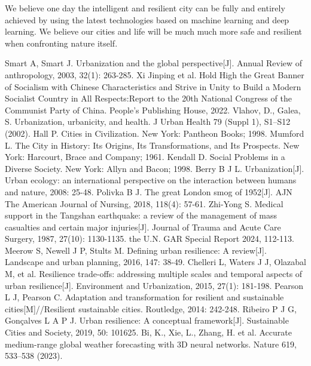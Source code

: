 \documentclass[conference]{IEEEtran}
\begin{document}
We believe one day the intelligent and resilient city can be fully and entirely achieved by using the latest technologies based on machine learning and deep learning. We believe our cities and life will be much much more safe and resilient when confronting nature itself.


\begin{thebibliography}{00}

 Smart A, Smart J. Urbanization and the global perspective[J]. Annual Review of anthropology, 2003, 32(1): 263-285.
 Xi Jinping et al. Hold High the Great Banner of Socialism with Chinese Characteristics and Strive in Unity to Build a Modern Socialist Country in All Respects:Report to the 20th National Congress of the Communist Party of China. People's Publishing House, 2022.
 Vlahov, D., Galea, S. Urbanization, urbanicity, and health. J Urban Health 79 (Suppl 1), S1–S12 (2002).
 Hall P. Cities in Civilization. New York: Pantheon Books; 1998.
 Mumford L. The City in History: Its Origins, Its Transformations, and Its Prospects. New York: Harcourt, Brace and Company; 1961.
 Kendall D. Social Problems in a Diverse Society. New York: Allyn and Bacon; 1998.
 Berry B J L. Urbanization[J]. Urban ecology: an international perspective on the interaction between humans and nature, 2008: 25-48.
 Polivka B J. The great London smog of 1952[J]. AJN The American Journal of Nursing, 2018, 118(4): 57-61.
 Zhi-Yong S. Medical support in the Tangshan earthquake: a review of the management of mass casualties and certain major injuries[J]. Journal of Trauma and Acute Care Surgery, 1987, 27(10): 1130-1135.
 the U.N. GAR Special Report 2024, 112-113.
 Meerow S, Newell J P, Stults M. Defining urban resilience: A review[J]. Landscape and urban planning, 2016, 147: 38-49.
 Chelleri L, Waters J J, Olazabal M, et al. Resilience trade-offs: addressing multiple scales and temporal aspects of urban resilience[J]. Environment and Urbanization, 2015, 27(1): 181-198.
 Pearson L J, Pearson C. Adaptation and transformation for resilient and sustainable cities[M]//Resilient sustainable cities. Routledge, 2014: 242-248.
 Ribeiro P J G, Gonçalves L A P J. Urban resilience: A conceptual framework[J]. Sustainable Cities and Society, 2019, 50: 101625.
 Bi, K., Xie, L., Zhang, H. et al. Accurate medium-range global weather forecasting with 3D neural networks. Nature 619, 533–538 (2023).

\end{thebibliography}
\end{document}

